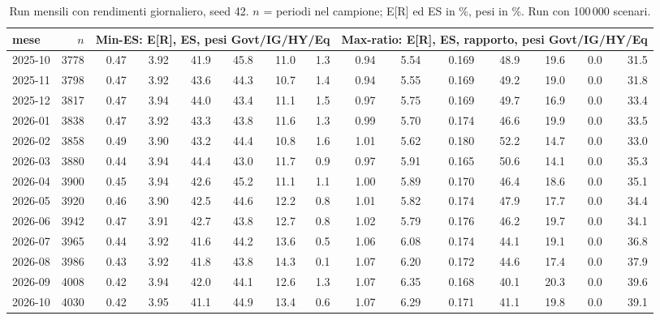 \begin{table}[htbp]\centering\scriptsize\setlength{\tabcolsep}{3.5pt}
\caption{Run mensili con rendimenti giornaliero, seed 42. $n$ = periodi nel campione; E[R] ed ES in \%, pesi in \%. Run con 100\,000 scenari.}\label{tab:runs_daily}
\begin{tabular}{lrrrrrrrrrrrrrr}\toprule
mese & $n$ & \multicolumn{6}{c}{Min-ES: E[R], ES, pesi Govt/IG/HY/Eq} & \multicolumn{7}{c}{Max-ratio: E[R], ES, rapporto, pesi Govt/IG/HY/Eq} \\\midrule
2025-10 & 3778 & 0.47 & 3.92 & 41.9 & 45.8 & 11.0 & 1.3 & 0.94 & 5.54 & 0.169 & 48.9 & 19.6 & 0.0 & 31.5 \\
2025-11 & 3798 & 0.47 & 3.92 & 43.6 & 44.3 & 10.7 & 1.4 & 0.94 & 5.55 & 0.169 & 49.2 & 19.0 & 0.0 & 31.8 \\
2025-12 & 3817 & 0.47 & 3.94 & 44.0 & 43.4 & 11.1 & 1.5 & 0.97 & 5.75 & 0.169 & 49.7 & 16.9 & 0.0 & 33.4 \\
2026-01 & 3838 & 0.47 & 3.92 & 43.3 & 43.8 & 11.6 & 1.3 & 0.99 & 5.70 & 0.174 & 46.6 & 19.9 & 0.0 & 33.5 \\
2026-02 & 3858 & 0.49 & 3.90 & 43.2 & 44.4 & 10.8 & 1.6 & 1.01 & 5.62 & 0.180 & 52.2 & 14.7 & 0.0 & 33.0 \\
2026-03 & 3880 & 0.44 & 3.94 & 44.4 & 43.0 & 11.7 & 0.9 & 0.97 & 5.91 & 0.165 & 50.6 & 14.1 & 0.0 & 35.3 \\
2026-04 & 3900 & 0.45 & 3.94 & 42.6 & 45.2 & 11.1 & 1.1 & 1.00 & 5.89 & 0.170 & 46.4 & 18.6 & 0.0 & 35.1 \\
2026-05 & 3920 & 0.46 & 3.90 & 42.5 & 44.6 & 12.2 & 0.8 & 1.01 & 5.82 & 0.174 & 47.9 & 17.7 & 0.0 & 34.4 \\
2026-06 & 3942 & 0.47 & 3.91 & 42.7 & 43.8 & 12.7 & 0.8 & 1.02 & 5.79 & 0.176 & 46.2 & 19.7 & 0.0 & 34.1 \\
2026-07 & 3965 & 0.44 & 3.92 & 41.6 & 44.2 & 13.6 & 0.5 & 1.06 & 6.08 & 0.174 & 44.1 & 19.1 & 0.0 & 36.8 \\
2026-08 & 3986 & 0.43 & 3.92 & 41.8 & 43.8 & 14.3 & 0.1 & 1.07 & 6.20 & 0.172 & 44.6 & 17.4 & 0.0 & 37.9 \\
2026-09 & 4008 & 0.42 & 3.94 & 42.0 & 44.1 & 12.6 & 1.3 & 1.07 & 6.35 & 0.168 & 40.1 & 20.3 & 0.0 & 39.6 \\
2026-10 & 4030 & 0.42 & 3.95 & 41.1 & 44.9 & 13.4 & 0.6 & 1.07 & 6.29 & 0.171 & 41.1 & 19.8 & 0.0 & 39.1 \\
\bottomrule\end{tabular}\end{table}

